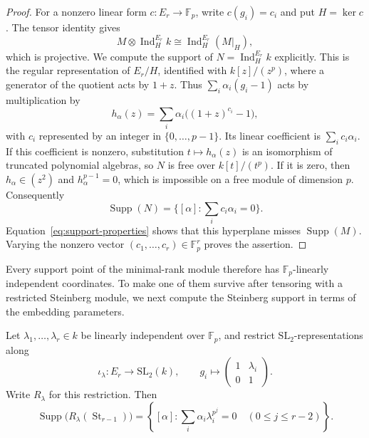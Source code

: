 \begin{proof}
For a nonzero linear form $c:E_r\to\mathbb F_p$, write $c(g_i)=c_i$ and
put $H=\ker c$.  The tensor identity gives
\[
 M\otimes\operatorname{Ind}_H^{E_r}k
 \cong\operatorname{Ind}_H^{E_r}(M|_H),
\]
which is projective.  We compute the support of
$N=\operatorname{Ind}_H^{E_r}k$ explicitly.  This is the regular
representation of $E_r/H$, identified with $k[z]/(z^p)$, where a
generator of the quotient acts by $1+z$.  Thus
$\sum_i\alpha_i(g_i-1)$ acts by multiplication by
\[
 h_\alpha(z)=\sum_i\alpha_i\big((1+z)^{c_i}-1\big),
\]
with $c_i$ represented by an integer in $\{0,\ldots,p-1\}$.
Its linear coefficient is $\sum_i c_i\alpha_i$.
If this coefficient is nonzero, substitution $t\mapsto h_\alpha(z)$
is an isomorphism of truncated polynomial algebras, so $N$ is free
over $k[t]/(t^p)$.  If it is zero, then $h_\alpha\in(z^2)$ and
$h_\alpha^{p-1}=0$, which is impossible on a free module of dimension
$p$.  Consequently
\[
 \operatorname{Supp}(N)
 =\{[\alpha]:\textstyle\sum_i c_i\alpha_i=0\}.
\]
Equation~\eqref{eq:support-properties} shows that this hyperplane misses
$\operatorname{Supp}(M)$.  Varying the nonzero vector
$(c_1,\ldots,c_r)\in\mathbb F_p^r$ proves the assertion.
\end{proof}

Every support point of the minimal-rank module therefore has
$\mathbb F_p$-linearly independent coordinates.
To make one of them survive after tensoring with a restricted Steinberg
module, we next compute the Steinberg support in terms of the embedding
parameters.

\begin{lemma}\label{lem:steinberg-support}
Let $\lambda_1,\ldots,\lambda_r\in k$ be linearly independent over
$\mathbb F_p$, and restrict $\mathrm{SL}_2$-representations along
\[
 \iota_\lambda:E_r\longrightarrow\mathrm{SL}_2(k),
 \qquad
 g_i\longmapsto
 \begin{pmatrix}1&\lambda_i\\0&1\end{pmatrix}.
\]
Write $R_\lambda$ for this restriction.  Then
\begin{equation}\label{eq:steinberg-support}
 \operatorname{Supp}\big(R_\lambda(\operatorname{St}_{r-1})\big)
 =\left\{[\alpha]:
 \sum_i\alpha_i\lambda_i^{p^j}=0\quad(0\le j\le r-2)\right\}.
\end{equation}
\end{lemma}

